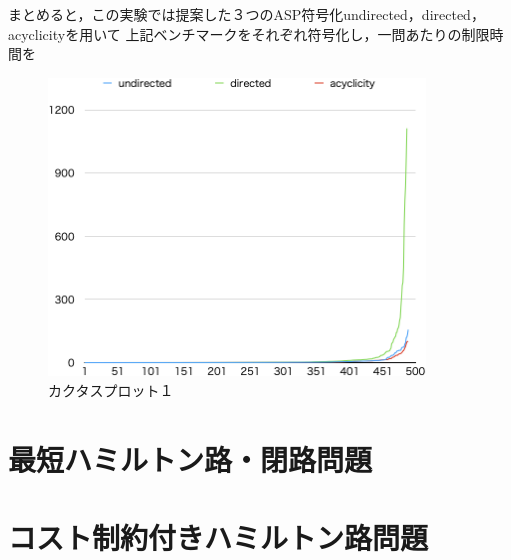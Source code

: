 まとめると，この実験では提案した３つのASP符号化undirected，directed，acyclicityを用いて
上記ベンチマークをそれぞれ符号化し，一問あたりの制限時間を
\begin{figure}[htbp]
\begin{center}
  \includegraphics[width=10cm]{fig/cactus.png}
\caption{カクタスプロット１}
\label{cactus}
\end{center}
\end{figure}

\section{最短ハミルトン路・閉路問題}


\section{コスト制約付きハミルトン路問題}


